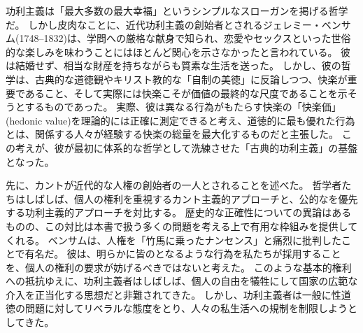 \documentclass[paper=a4,book,openany]{jlreq}
\begin{document}
功利主義は「最大多数の最大幸福」というシンプルなスローガンを掲げる哲学だ。
しかし皮肉なことに、近代功利主義の創始者とされるジェレミー・ベンサム(1748--1832)は、学問への厳格な献身で知られ、恋愛やセックスといった世俗的な楽しみを味わうことにはほとんど関心を示さなかったと言われている。
彼は結婚せず、相当な財産を持ちながらも質素な生活を送った。
しかし、彼の哲学は、古典的な道徳観やキリスト教的な「自制の美徳」に反論しつつ、快楽が重要であること、そして実際には快楽こそが価値の最終的な尺度であることを示そうとするものであった。
実際、彼は異なる行為がもたらす快楽の「快楽価」(hedonic value)を理論的には正確に測定できると考え、道徳的に最も優れた行為とは、関係する人々が経験する快楽の総量を最大化するものだと主張した。
この考えが、彼が最初に体系的な哲学として洗練させた「古典的功利主義」の基盤となった。

先に、カントが近代的な人権の創始者の一人とされることを述べた。
哲学者たちはしばしば、個人の権利を重視するカント主義的アプローチと、公的なを優先する功利主義的アプローチを対比する。
歴史的な正確性についての異論はあるものの、この対比は本書で扱う多くの問題を考える上で有用な枠組みを提供してくれる。
ベンサムは、人権を「竹馬に乗ったナンセンス」と痛烈に批判したことで有名だ。
彼は、明らかに皆のとなるような行為を私たちが採用することを、個人の権利の要求が妨げるべきではないと考えた。
このような基本的権利への抵抗ゆえに、功利主義者はしばしば、個人の自由を犠牲にして国家の広範な介入を正当化する思想だと非難されてきた。
しかし、功利主義者は一般に性道徳の問題に対してリベラルな態度をとり、人々の私生活への規制を制限しようとしてきた。
\end{document}
